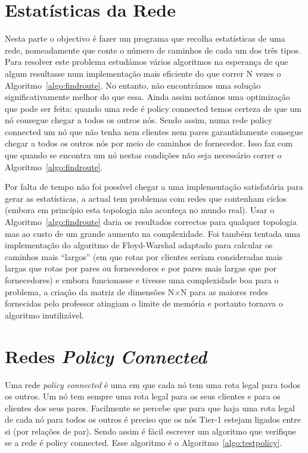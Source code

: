 \documentclass[10pt,a4paper]{article}
\begin{document}
\section{Estatísticas da Rede}
Nesta parte o objectivo é fazer um programa que recolha estatísticas de uma rede, nomeadamente que conte o número de caminhos de cada um dos três tipos. Para resolver este problema estudámos vários algoritmos na esperança de que algum resultasse num implementação mais eficiente do que correr N vezes o Algoritmo~\ref{algo:findroute}. No entanto, não encontrámos uma solução significativamente melhor do que essa. Ainda assim notámos uma optimização que pode ser feita: quando uma rede é policy connected temos certeza de que um nó consegue chegar a todos os outros nós. Sendo assim, numa rede policy connected um nó que não tenha nem clientes nem pares garantidamente consegue chegar a todos os outros nós por meio de caminhos de fornecedor. Isso faz com que quando se encontra um nó nestas condições não seja necessário correr o Algoritmo~\ref{algo:findroute}.

Por falta de tempo não foi possível chegar a uma implementação satisfatória para gerar as estatísticas, a actual tem problemas com redes que contenham ciclos (embora em princípio esta topologia não aconteça no mundo real). Usar o Algoritmo~\ref{algo:findroute} daria os resultados correctos para qualquer topologia mas ao custo de um grande aumento na complexidade. Foi também tentada uma implementação do algoritmo de Floyd-Warshal adaptado para calcular os caminhos mais ``largos'' (em que rotas por clientes seriam consideradas mais largas que rotas por pares ou fornecedores e por pares mais largas que por fornecedores) e embora funcionasse e tivesse uma complexidade boa para o problema, a criação da matriz de dimensões N$\times$N para as maiores redes fornecidas pelo professor atingiam o limite de memória e portanto tornava o algoritmo inutilizável.


\section{Redes \textit{Policy Connected}}
Uma rede \textit{policy connected} é uma em que cada nó tem uma rota legal para todos os outros. Um nó tem sempre uma rota legal para os seus clientes e para os clientes dos seus pares. Facilmente se percebe que para que haja uma rota legal de cada nó para todos os outros é preciso que os nós Tier-1 estejam ligados entre si (por relações de par). Sendo assim é fácil escrever um algoritmo que verifique se a rede é policy connected. Esse algoritmo é o Algoritmo~\ref{algo:testpolicy}.
\end{document}
